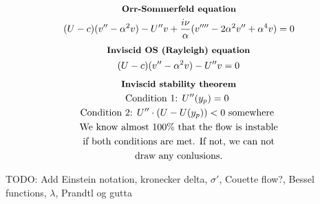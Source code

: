 \documentclass[10pt, a4paper]{article}
\begin{document}
\begin{multicols*}{2}
    \begin{gather*}
        \textbf{\small Orr-Sommerfeld equation} \\
        (U - c)(v''-\alpha^2 v) - U''v + \frac{i\nu}{\alpha}(v''''-2\alpha^2v''+\alpha^4v) = 0
    \end{gather*}
    \begin{gather*}
        \textbf{\small Inviscid OS (Rayleigh) equation} \\
        (U - c)(v''-\alpha^2 v) - U''v = 0
    \end{gather*}
    \begin{gather*}
        \textbf{\small Inviscid stability theorem} \\
        \text{Condition 1: $U''(y_p) = 0$ } \\
        \text{Condition 2: $U''\cdot(U-U(y_p)) < 0$ somewhere } \\
        \text{We know almost 100\% that the flow is instable}\\ 
        \text{if both conditions are met. If not, we can not} \\
        \text{draw any conlusions.}
    \end{gather*}
\end{multicols*}

TODO: Add Einstein notation, kronecker delta, $\sigma '$, Couette flow?, Bessel functions, $\lambda$, Prandtl og gutta
\end{document}
